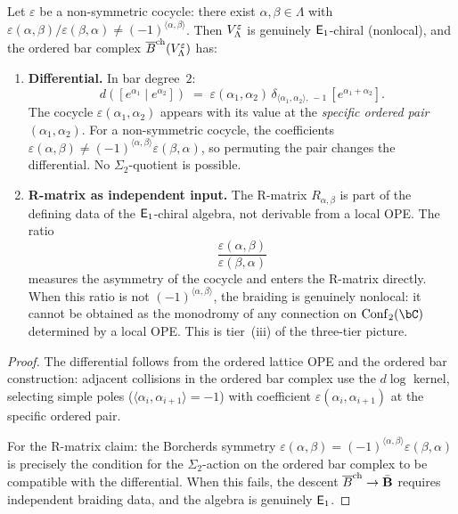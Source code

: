 \begin{theorem}
\label{thm:lattice-nonsymmetric-ordered-bar}
Let $\varepsilon$ be a non-symmetric cocycle: there exist
$\alpha, \beta \in \Lambda$ with
$\varepsilon(\alpha,\beta)/\varepsilon(\beta,\alpha) \neq
(-1)^{\langle\alpha,\beta\rangle}$. Then
$V_\Lambda^\varepsilon$ is genuinely $\mathsf{E}_1$-chiral
\textup{(}nonlocal\textup{)},
and the ordered bar complex $\overline{B}^{\mathrm{ch}}(V_\Lambda^\varepsilon)$ has:

\begin{enumerate}[label=\textup{(\arabic*)}]
\item \textbf{Differential.} In bar degree~$2$:
\begin{equation}\label{eq:lattice-nonsym-diff}
d([e^{\alpha_1} \mid e^{\alpha_2}])
\;=\; \varepsilon(\alpha_1,\alpha_2)\,
 \delta_{\langle\alpha_1,\alpha_2\rangle,\,-1}\,
 [e^{\alpha_1 + \alpha_2}].
\end{equation}
The cocycle $\varepsilon(\alpha_1,\alpha_2)$ appears with its value at
the \emph{specific ordered pair} $(\alpha_1, \alpha_2)$. For a
non-symmetric cocycle, the coefficients
$\varepsilon(\alpha,\beta) \neq
(-1)^{\langle\alpha,\beta\rangle}\varepsilon(\beta,\alpha)$, so
permuting the pair changes the differential. No $\Sigma_2$-quotient is
possible.

\item \textbf{R-matrix as independent input.}
The R-matrix $R_{\alpha,\beta}$ is part of the defining data of the
$\mathsf{E}_1$-chiral algebra, not derivable from a local OPE. The ratio
\begin{equation}\label{eq:lattice-nonsym-rmatrix-ratio}
\frac{\varepsilon(\alpha,\beta)}{\varepsilon(\beta,\alpha)}
\end{equation}
measures the asymmetry of the cocycle and enters the R-matrix directly.
When this ratio is not $(-1)^{\langle\alpha,\beta\rangle}$, the
braiding is genuinely nonlocal: it cannot be obtained as the monodromy
of any connection on $\operatorname{Conf}_2(\bC)$ determined by a local
OPE. This is tier~(iii) of the three-tier picture.
\end{enumerate}
\end{theorem}

\begin{proof}
The differential follows from the ordered lattice OPE and the ordered
bar construction: adjacent collisions in the ordered bar complex use the
$d\log$ kernel, selecting simple poles
($\langle\alpha_i,\alpha_{i+1}\rangle = -1$) with coefficient
$\varepsilon(\alpha_i, \alpha_{i+1})$ at the specific ordered pair.

For the R-matrix claim: the Borcherds symmetry
$\varepsilon(\alpha,\beta) =
(-1)^{\langle\alpha,\beta\rangle}\varepsilon(\beta,\alpha)$
is precisely the condition for the $\Sigma_2$-action on the ordered bar
complex to be compatible with the differential. When this fails, the
descent $\overline{B}^{\mathrm{ch}} \to \bar{\mathbf{B}}$ requires independent braiding data, and
the algebra is genuinely $\mathsf{E}_1$.
\end{proof}

